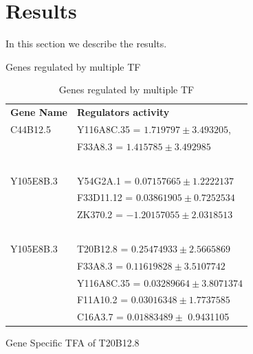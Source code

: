 \documentclass[12pt]{article}
\begin{document}
\section{Results}\label{results}
In this section we describe the results.

Genes regulated by multiple TF
        \begin{table}
	  \begin{tabular}{l l }
	      \textbf{Gene Name} & \textbf{Regulators activity} \\
	      {\color{red}C44B12.5} & {\color{blue} Y116A8C.35 }= $ 1.719797 \pm 3.493205 $, \\ 
				    & {\color{blue}F33A8.3} = $ 1.415785 \pm 3.492985$ \\~\\

		{\color{red}Y105E8B.3} & {\color{blue} Y54G2A.1} = $ 0.07157665 \pm 1.2222137 $ \\
		  & {\color{blue} F33D11.12} = $ 0.03861905 \pm 0.7252534 $ \\
 		  & {\color{blue} ZK370.2} = $ -1.20157055 \pm  2.0318513 $\\~\\
		    
	      {\color{red} Y105E8B.3} & {\color{blue} T20B12.8 } = $ 0.25474933 \pm  2.5665869 $ \\
		  			& {\color{blue} F33A8.3 } = $ 0.11619828  \pm  3.5107742 $ \\
 		  			& {\color{blue} Y116A8C.35 } = $ 0.03289664 \pm  3.8071374 $ \\
					& {\color{blue} F11A10.2 } = $ 0.03016348 \pm 1.7737585 $ \\
 		  			& {\color{blue} C16A3.7  } = $ 0.01883489 \pm  $ 0.9431105\\

	  \end{tabular}
	  \caption{Genes regulated by multiple TF}
	  \end{table}


      Gene Specific TFA of T20B12.8
    
\end{document}
